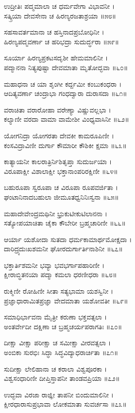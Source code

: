 ಉದ್ರೀತಿಃ ಪದ್ಮಮಾಲಾ ಚ ಧರ್ಮವೇಗಾ ವಿಭಾವನೀ ।\\
ಸತ್ಕ್ರಿಯಾ ದೇವಸೇನಾ ಚ ಹಿರಣ್ಯರಜತಾಶ್ರಯಾ ॥೫೮॥

ಸಹಸಾವರ್ತಮಾನಾ ಚ ಹಸ್ತಿನಾದಪ್ರಬೋಧಿನೀ ।\\
ಹಿರಣ್ಯಪದ್ಮವರ್ಣಾ ಚ ಹರಿಭದ್ರಾ ಸುದುರ್ದ್ಧರಾ ॥೫೯॥

ಸೂರ್ಯಾ ಹಿರಣ್ಯಪ್ರಕಟಸದೃಶೀ ಹೇಮಮಾಲಿನೀ ।\\
ಪದ್ಮಾನನಾ ನಿತ್ಯಪುಷ್ಟಾ ದೇವಮಾತಾ ಮೃತೋದ್ಭವಾ ॥೬೦॥

ಮಹಾಧನಾ ಚ ಯಾ ಶೃಂಗೀ ಕರ್ದ್ದಮೀ ಕಂಬುಕಂಧರಾ ।\\
ಆದಿತ್ಯವರ್ಣಾ ಚಂದ್ರಾಭಾ ಗಂಧದ್ವಾರಾ ದುರಾಸದಾ ॥೬೧॥

ವರಾಚಿತಾ ವರಾರೋಹಾ ವರೇಣ್ಯಾ ವಿಷ್ಣುವಲ್ಲಭಾ ।\\
ಕಲ್ಯಾಣೀ ವರದಾ ವಾಮಾ ವಾಮೇಶೀ ವಿಂಧ್ಯವಾಸಿನೀ ॥೬೨॥

ಯೋಗನಿದ್ರಾ ಯೋಗರತಾ ದೇವಕೀ ಕಾಮರೂಪಿಣೀ ।\\
ಕಂಸವಿದ್ರಾವಿಣೀ ದುರ್ಗಾ ಕೌಮಾರೀ ಕೌಶಿಕೀ ಕ್ಷಮಾ ॥೬೩॥

ಕಾತ್ಯಾಯನೀ ಕಾಲರಾತ್ರಿರ್ನಿಶಿತೃಪ್ತಾ ಸುದುರ್ಜಯಾ ।\\
ವಿರೂಪಾಕ್ಷೀ ವಿಶಾಲಾಕ್ಷೀ ಭಕ್ತಾನಾಂಪರಿರಕ್ಷಿಣೀ ॥೬೪॥

ಬಹುರೂಪಾ ಸ್ವರೂಪಾ ಚ ವಿರೂಪಾ ರೂಪವರ್ಜಿತಾ ।\\
ಘಂಟಾನಿನಾದಬಹುಲಾ ಜೀಮೂತಧ್ವನಿನಿಃಸ್ವನಾ ॥೬೫॥

ಮಹಾದೇವೇಂದ್ರಮಥಿನೀ ಭ್ರುಕುಟೀಕುಟಿಲಾನನಾ ।\\
ಸತ್ಯೋಪಯಾಚಿತಾ ಚೈಕಾ ಕೌಬೇರೀ ಬ್ರಹ್ಮಚಾರಿಣೀ ॥೬೬॥

ಆರ್ಯಾ ಯಶೋದಾ ಸುತದಾ ಧರ್ಮಕಾಮಾರ್ಥಮೋಕ್ಷದಾ ।\\
ದಾರಿದ್ರ್ಯದುಃಖಶಮನೀ ಘೋರದುರ್ಗಾರ್ತಿನಾಶಿನೀ ॥೬೭॥

ಭಕ್ತಾರ್ತಿಶಮನೀ ಭವ್ಯಾ ಭವಭರ್ಗಾಪಹಾರಿಣೀ ।\\
ಕ್ಷೀರಾಬ್ಧಿತನಯಾ ಪದ್ಮಾ ಕಮಲಾ ಧರಣೀಧರಾ ॥೬೮॥

ರುಕ್ಮಿಣೀ ರೋಹಿಣೀ ಸೀತಾ ಸತ್ಯಭಾಮಾ ಯಶಸ್ವಿನೀ ।\\
ಪ್ರಜ್ಞಾಧಾರಾಮಿತಪ್ರಜ್ಞಾ ವೇದಮಾತಾ ಯಶೋವತೀ ॥೬೯॥

ಸಮಾಧಿರ್ಭಾವನಾ ಮೈತ್ರೀ ಕರುಣಾ ಭಕ್ತವತ್ಸಲಾ ।\\
ಅಂತರ್ವೇದೀ ದಕ್ಷಿಣಾ ಚ ಬ್ರಹ್ಮಚರ್ಯಪರಾಗತಿಃ ॥೭೦॥

ದೀಕ್ಷಾ ವೀಕ್ಷಾ ಪರೀಕ್ಷಾ ಚ ಸಮೀಕ್ಷಾ ವೀರವತ್ಸಲಾ ।\\
ಅಂಬಿಕಾ ಸುರಭಿಃ ಸಿದ್ಧಾ ಸಿದ್ಧವಿದ್ಯಾಧರಾರ್ಚಿತಾ ॥೭೧॥

ಸುದೀಕ್ಷಾ ಲೇಲಿಹಾನಾ ಚ ಕರಾಲಾ ವಿಶ್ವಪೂರಕಾ ।\\
ವಿಶ್ವಸಂಧಾರಿಣೀ ದೀಪ್ತಿಸ್ತಾಪನೀ ತಾಂಡವಪ್ರಿಯಾ ॥೭೨॥

ಉದ್ಭವಾ ವಿರಜಾ ರಾಜ್ಞೀ ತಾಪನೀ ಬಿಂದುಮಾಲಿನೀ ।\\
ಕ್ಷೀರಧಾರಾಸುಪ್ರಭಾವಾ ಲೋಕಮಾತಾ ಸುವರ್ಚಸಾ ॥೭೩॥

